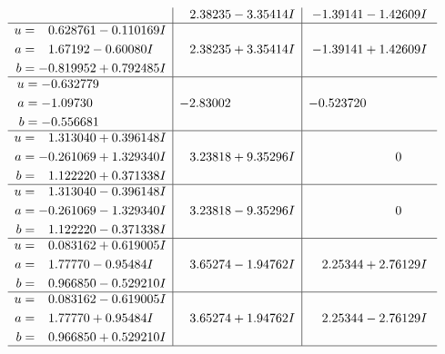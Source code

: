 \documentclass[1p]{elsarticle_modified}
\theoremstyle{definition}
\begin{document}
$$\begin{array}{c|c|c}
 & \phantom{-}2.38235 - 3.35414 I & -1.39141 - 1.42609 I \\ \hline\begin{aligned}
u &= \phantom{-}0.628761 - 0.110169 I \\
a &= \phantom{-}1.67192 - 0.60080 I \\
b &= -0.819952 + 0.792485 I\end{aligned}
 & \phantom{-}2.38235 + 3.35414 I & -1.39141 + 1.42609 I \\ \hline\begin{aligned}
u &= -0.632779\phantom{ +0.000000I} \\
a &= -1.09730\phantom{ +0.000000I} \\
b &= -0.556681\phantom{ +0.000000I}\end{aligned}
 & -2.83002\phantom{ +0.000000I} & -0.523720\phantom{ +0.000000I} \\ \hline\begin{aligned}
u &= \phantom{-}1.313040 + 0.396148 I \\
a &= -0.261069 + 1.329340 I \\
b &= \phantom{-}1.122220 + 0.371338 I\end{aligned}
 & \phantom{-}3.23818 + 9.35296 I & \phantom{-0.000000 } 0 \\ \hline\begin{aligned}
u &= \phantom{-}1.313040 - 0.396148 I \\
a &= -0.261069 - 1.329340 I \\
b &= \phantom{-}1.122220 - 0.371338 I\end{aligned}
 & \phantom{-}3.23818 - 9.35296 I & \phantom{-0.000000 } 0 \\ \hline\begin{aligned}
u &= \phantom{-}0.083162 + 0.619005 I \\
a &= \phantom{-}1.77770 - 0.95484 I \\
b &= \phantom{-}0.966850 - 0.529210 I\end{aligned}
 & \phantom{-}3.65274 - 1.94762 I & \phantom{-}2.25344 + 2.76129 I \\ \hline\begin{aligned}
u &= \phantom{-}0.083162 - 0.619005 I \\
a &= \phantom{-}1.77770 + 0.95484 I \\
b &= \phantom{-}0.966850 + 0.529210 I\end{aligned}
 & \phantom{-}3.65274 + 1.94762 I & \phantom{-}2.25344 - 2.76129 I\\
 \hline 
 \end{array}$$\newpage$$\begin{array}{c|c|c}  

\end{array}$$
\end{document}

